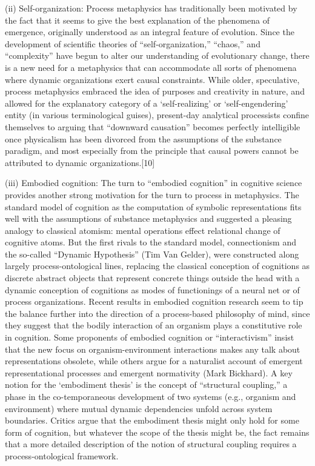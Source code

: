 (ii) Self-organization: Process metaphysics has traditionally been motivated by the fact that it seems to give the best explanation of the phenomena of emergence, originally understood as an integral feature of evolution. Since the development of scientific theories of “self-organization,” “chaos,” and “complexity” have begun to alter our understanding of evolutionary change, there is a new need for a metaphysics that can accommodate all sorts of phenomena where dynamic organizations exert causal constraints. While older, speculative, process metaphysics embraced the idea of purposes and creativity in nature, and allowed for the explanatory category of a ‘self-realizing’ or ‘self-engendering’ entity (in various terminological guises), present-day analytical processists confine themselves to arguing that “downward causation” becomes perfectly intelligible once physicalism has been divorced from the assumptions of the substance paradigm, and most especially from the principle that causal powers cannot be attributed to dynamic organizations.[10]

(iii) Embodied cognition: The turn to “embodied cognition” in cognitive science provides another strong motivation for the turn to process in metaphysics. The standard model of cognition as the computation of symbolic representations fits well with the assumptions of substance metaphysics and suggested a pleasing analogy to classical atomism: mental operations effect relational change of cognitive atoms. But the first rivals to the standard model, connectionism and the so-called “Dynamic Hypothesis” (Tim Van Gelder), were constructed along largely process-ontological lines, replacing the classical conception of cognitions as discrete abstract objects that represent concrete things outside the head with a dynamic conception of cognitions as modes of functionings of a neural net or of process organizations. Recent results in embodied cognition research seem to tip the balance further into the direction of a process-based philosophy of mind, since they suggest that the bodily interaction of an organism plays a constitutive role in cognition. Some proponents of embodied cognition or “interactivism” insist that the new focus on organism-environment interactions makes any talk about representations obsolete, while others argue for a naturalist account of emergent representational processes and emergent normativity (Mark Bickhard). A key notion for the ‘embodiment thesis’ is the concept of “structural coupling,” a phase in the co-temporaneous development of two systems (e.g., organism and environment) where mutual dynamic dependencies unfold across system boundaries. Critics argue that the embodiment thesis might only hold for some form of cognition, but whatever the scope of the thesis might be, the fact remains that a more detailed description of the notion of structural coupling requires a process-ontological framework.

